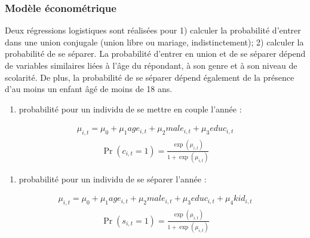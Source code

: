 \documentclass[letterpaper,10pt,french]{sphinxmanual}
\begin{document}
\subsubsection{Modèle économétrique}
\label{\detokenize{methodologie:model3}}\label{\detokenize{methodologie:id7}}
Deux régressions logistiques sont réalisées pour 1) calculer la probabilité d’entrer dans une union conjugale (union libre ou mariage, indistinctement);
2) calculer la probabilité de se séparer. La probabilité d’entrer en union et de se séparer dépend de variables similaires liées à l’âge du répondant, à son genre et à son niveau de scolarité. De plus, la probabilité de se séparer dépend également de la présence d’au moins un enfant âgé de moins de 18 ans.
\begin{enumerate}
%
\item {} 
probabilité  pour un individu  de se mettre en couple l’année :

\end{enumerate}
\begin{equation*}
\begin{split}\mu_{i,t} = \mu_{0} + \mu_{1} age_{i,t} + \mu_{2} male_{i,t} + \mu_{3} educ_{i,t}\end{split}
\end{equation*}\begin{equation*}
\begin{split}\Pr(c_{i,t}=1) = \frac{\exp(\mu_{i,t})}{1+\exp(\mu_{i,t})}\end{split}
\end{equation*}\begin{enumerate}
%
\setcounter{enumi}{1}
\item {} 
probabilité  pour un individu  de se séparer l’année :

\end{enumerate}
\begin{equation*}
\begin{split}\mu_{i,t} = \mu_{0} + \mu_{1} age_{i,t} + \mu_{2} male_{i,t} + \mu_{3} educ_{i,t} + \mu_{4} kid_{i,t}\end{split}
\end{equation*}\begin{equation*}
\begin{split}\Pr(s_{i,t}=1) = \frac{\exp(\mu_{i,t})}{1+\exp(\mu_{i,t})}\end{split}
\end{equation*}
\end{document}
